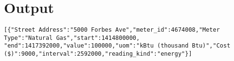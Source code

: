 \documentclass[12pt]{article}
\begin{document}
\section{Output} 

\begin{verbatim}
[{"Street Address":"5000 Forbes Ave","meter_id":4674008,"Meter Type":"Natural Gas","start":1414800000,
"end":1417392000,"value":100000,"uom":"kBtu (thousand Btu)","Cost ($)":9000,"interval":2592000,"reading_kind":"energy"}] 
\end{verbatim}
\newpage


\end{document}
